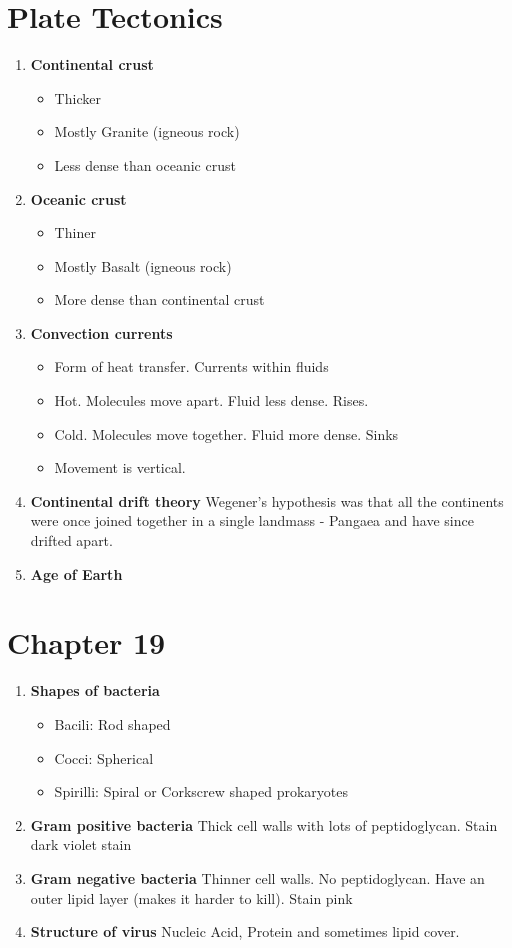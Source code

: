 \documentclass[9pt]{article}
\begin{document}
\section*{Plate Tectonics}
\begin{enumerate}
  \item {\bf Continental crust}
    \begin{itemize}
      \item Thicker
      \item Mostly Granite (igneous rock)
      \item Less dense than oceanic crust
    \end{itemize}
  \item {\bf Oceanic crust}
    \begin{itemize}
      \item Thiner
      \item Mostly Basalt (igneous rock)
      \item More  dense than continental crust
    \end{itemize}
  \item {\bf Convection currents}
    \begin{itemize}
      \item Form of heat transfer. Currents within fluids
      \item Hot. Molecules move apart. Fluid less dense. Rises.
      \item Cold. Molecules move together. Fluid more dense. Sinks
      \item Movement is vertical.
    \end{itemize}
  \item {\bf Continental drift theory} Wegener's hypothesis was that
    all the continents were once joined together in a single landmass
    - Pangaea and have since drifted apart.
  \item {\bf Age of Earth}
\end{enumerate}
\section*{Chapter 19}
\begin{enumerate}
  \item {\bf Shapes of bacteria}
    \begin{itemize}
    \item Bacili: Rod shaped
    \item Cocci: Spherical
    \item Spirilli: Spiral or Corkscrew shaped prokaryotes
    \end{itemize}
  \item {\bf Gram positive bacteria} Thick cell walls with lots of
    peptidoglycan.  Stain dark violet stain
  \item {\bf Gram negative bacteria} Thinner cell walls. No
    peptidoglycan. Have an outer lipid layer (makes it harder to
    kill). Stain pink
  \item {\bf Structure of virus} Nucleic Acid, Protein and sometimes
    lipid cover.
\end{enumerate}
\end{document}
